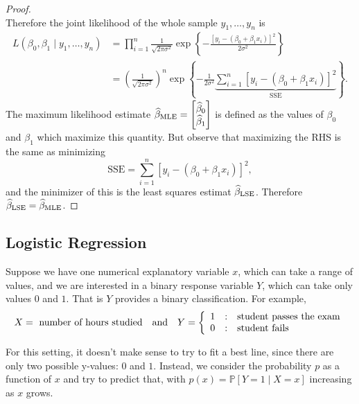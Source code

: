 \documentclass[10pt]{article}
\theoremstyle{definition}
\newcommand{\1}[1]{\textbf{1}_{\left[#1\right]}} %
\def\P{\mathbb{P}} %
\begin{document}
\begin{proof}
\begin{equation*}
  \end{equation*}
  Therefore the joint likelihood of the whole sample $y_{1},\ldots,y_{n}$ is
  \begin{align*}
    L(\beta_{0},\beta_{1}\mid y_{1},\ldots,y_{n}) 
    &= \prod_{i=1}^{n}\frac{1}{\sqrt{2\pi \sigma^{2}}} \exp\left\{-\frac{\left[ y_{i}- (\beta_{0}+\beta_{1}x_{i}) \right]^{2} }{2\sigma^{2}} \right\}\\
    &= \left( \frac{1}{\sqrt{2\pi \sigma^{2}}} \right)^{n} \exp\left\{-\frac{1}{2\sigma^{2}}\underbrace{\sum_{i=1}^{n} \left[ y_{i}- (\beta_{0}+\beta_{1}x_{i}) \right]^{2}}_{\mathrm{SSE}} \right\}.
  \end{align*}
  The maximum likelihood estimate $\widehat{\beta}_{\rm MLE} =
  \begin{bmatrix}
    \widehat{\beta}_{0}\\
    \widehat{\beta}_{1}
  \end{bmatrix}
  $ is defined as the values of $\beta_{0}$ and $\beta_{1}$ which maximize
  this quantity. But observe that maximizing the RHS is the same as minimizing
  \begin{equation*}
    \mathrm{SSE} =\sum_{i=1}^{n} \left[ y_{i}- (\beta_{0}+\beta_{1}x_{i}) \right]^{2},
  \end{equation*}
  and the minimizer of this is the least squares estimat
  $\widehat{\beta}_{\rm LSE}$. Therefore $\widehat{\beta}_{\rm LSE}=\widehat{\beta}_{\rm MLE}$.
\end{proof}

\subsection{Logistic Regression}

Suppose we have one numerical explanatory variable $x$, which can take a range
of values, and we are interested in a binary response variable $Y$, which can
take only values $0$ and $1$. That is $Y$ provides a binary classification.
For example,
\begin{equation*}
  X= \text{ number of hours studied} \quad \text{and} \quad Y =
  \left\{ \begin{array}{l@{\quad:\quad}l}
      1 &\text{student passes the exam} \\
      0& \text{student fails} \end{array}\right.
\end{equation*}

For this setting, it doesn't make sense to try to fit a best line, since there
are only two possible y-values: $0$ and $1$. Instead, we consider the
probability $p$ as a function of $x$ and try to predict that, with
$p(x)=\P\left[Y=1\mid X=x \right]$ increasing as $x$ grows.
\end{document}
